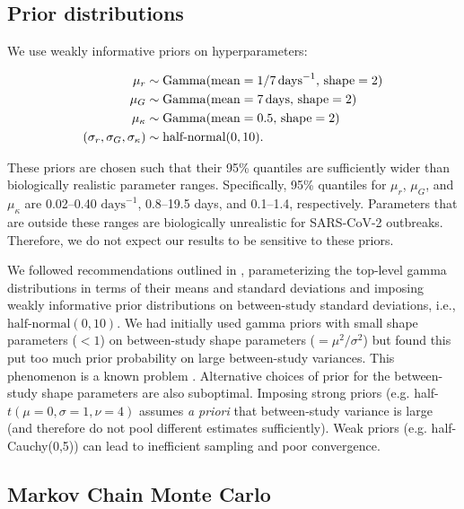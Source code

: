 \documentclass[12pt]{article}
\begin{document}
\subsection{Prior distributions}

We use weakly informative priors on hyperparameters:
\begin{linenomath*}
\begin{equation}
\begin{aligned}
\mu_r &\sim \mathrm{Gamma}(\mathrm{mean}=1/7\,\mathrm{days}^{-1},\,\mathrm{shape}=2)\\
\mu_G &\sim \mathrm{Gamma}(\mathrm{mean}=7\,\mathrm{days},\,\mathrm{shape}=2)\\
\mu_\kappa &\sim \mathrm{Gamma}(\mathrm{mean}=0.5,\,\mathrm{shape}=2)\\
(\sigma_r, \sigma_G, \sigma_\kappa) &\sim \textrm{half-normal}(0, 10).
\end{aligned}
\end{equation}
\end{linenomath*}
These priors are chosen such that their 95\% quantiles are sufficiently wider than biologically realistic parameter ranges.
Specifically, 95\% quantiles for $\mu_r$, $\mu_G$, and $\mu_\kappa$ are 0.02--0.40 $\mathrm{days}^{-1}$, 0.8--19.5 days, and 0.1--1.4, respectively.
Parameters that are outside these ranges are biologically unrealistic for SARS-CoV-2 outbreaks.
Therefore, we do not expect our results to be sensitive to these priors.

We followed recommendations outlined in \cite{gelman2006prior}, parameterizing the top-level gamma distributions in terms of their means and standard deviations and imposing weakly informative prior distributions on between-study standard deviations, i.e., $\textrm{half-normal}(0, 10)$.
We had initially used gamma priors with small shape parameters ($< 1$) on between-study shape parameters ($=\mu^2/\sigma^2$) but found this put too much prior probability on large between-study variances. This phenomenon is a known problem \citep{gelman2006prior}.
Alternative choices of prior for the between-study shape parameters are also suboptimal. 
Imposing strong priors (e.g. half-$t(\mu=0,\sigma=1,\nu=4)$ assumes \textit{a priori} that between-study variance is large (and therefore do not pool different estimates sufficiently).
Weak priors (e.g. half-Cauchy(0,5)) can lead to inefficient sampling and poor convergence.

\subsection{Markov Chain Monte Carlo}
\end{document}
